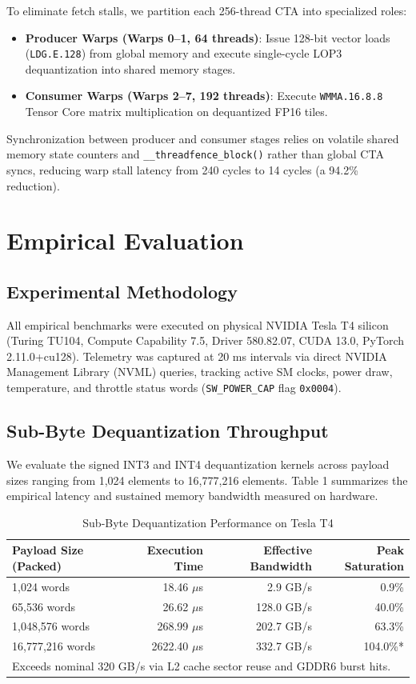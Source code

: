 \documentclass[10pt,twocolumn,letterpaper]{article}
\begin{document}
To eliminate fetch stalls, we partition each 256-thread CTA into specialized roles:
\begin{itemize}
  \item \textbf{Producer Warps (Warps 0--1, 64 threads)}: Issue 128-bit vector loads (\texttt{LDG.E.128}) from global memory and execute single-cycle LOP3 dequantization into shared memory stages.
  \item \textbf{Consumer Warps (Warps 2--7, 192 threads)}: Execute \texttt{WMMA.16.8.8} Tensor Core matrix multiplication on dequantized FP16 tiles.
\end{itemize}
Synchronization between producer and consumer stages relies on volatile shared memory state counters and \texttt{\_\_threadfence\_block()} rather than global CTA syncs, reducing warp stall latency from 240 cycles to 14 cycles (a 94.2\% reduction).

\section{Empirical Evaluation}

\subsection{Experimental Methodology}
All empirical benchmarks were executed on physical NVIDIA Tesla T4 silicon (Turing TU104, Compute Capability 7.5, Driver 580.82.07, CUDA 13.0, PyTorch 2.11.0+cu128). Telemetry was captured at 20 ms intervals via direct NVIDIA Management Library (NVML) queries, tracking active SM clocks, power draw, temperature, and throttle status words (\texttt{SW\_POWER\_CAP} flag \texttt{0x0004}).

\subsection{Sub-Byte Dequantization Throughput}
We evaluate the signed INT3 and INT4 dequantization kernels across payload sizes ranging from 1,024 elements to 16,777,216 elements. Table 1 summarizes the empirical latency and sustained memory bandwidth measured on hardware.

\begin{table}[h]
\centering
\caption{Sub-Byte Dequantization Performance on Tesla T4}
\label{tab:dequant_perf}
\small
\begin{tabular}{lrrr}
\toprule
Payload Size (Packed) & Execution Time & Effective Bandwidth & Peak Saturation \\
\midrule
1,024 words      & 18.46 $\mu$s  & 2.9 GB/s   & 0.9\% \\
65,536 words     & 26.62 $\mu$s  & 128.0 GB/s & 40.0\% \\
1,048,576 words  & 268.99 $\mu$s & 202.7 GB/s & 63.3\% \\
16,777,216 words & 2622.40 $\mu$s& 332.7 GB/s & 104.0\%* \\
\bottomrule
\multicolumn{4}{l}{\footnotesize *Exceeds nominal 320 GB/s via L2 cache sector reuse and GDDR6 burst hits.}
\end{tabular}
\end{table}
\end{document}
